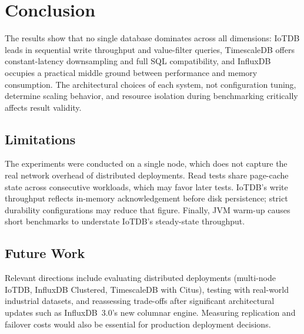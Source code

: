 \section{Conclusion}
\label{sec:conclusion}

The results show that no single database dominates across all dimensions: IoTDB leads in
sequential write throughput and value-filter queries, TimescaleDB offers constant-latency
downsampling and full SQL compatibility, and InfluxDB occupies a practical middle ground
between performance and memory consumption. The architectural choices of each system, not
configuration tuning, determine scaling behavior, and resource isolation during benchmarking
critically affects result validity.

\subsection{Limitations}
\label{sec:limitations}

The experiments were conducted on a single node, which does not capture the real network
overhead of distributed deployments. Read tests share page-cache state across consecutive
workloads, which may favor later tests. IoTDB's write throughput reflects in-memory
acknowledgement before disk persistence; strict durability configurations may reduce that
figure. Finally, JVM warm-up causes short benchmarks to understate IoTDB's steady-state
throughput.

\subsection{Future Work}
\label{sec:future-work}

Relevant directions include evaluating distributed deployments (multi-node IoTDB, InfluxDB
Clustered, TimescaleDB with Citus), testing with real-world industrial datasets, and
reassessing trade-offs after significant architectural updates such as InfluxDB~3.0's new
columnar engine. Measuring replication and failover costs would also be essential for
production deployment decisions.
